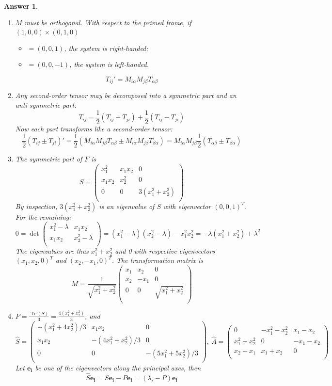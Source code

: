 \documentclass[a4paper]{article}
\DeclareMathOperator{\Tr}{Tr}
\newtheorem{ans}{Answer}[section]
\theoremstyle{new}
\begin{document}
\begin{ans}\leavevmode
\begin{enumerate}[label=(\alph*)]
\item $M$ must be orthogonal. With respect to the primed frame, if $(1,0,0)\times(0,1,0)$
\begin{itemize}
    \item $=(0,0,1)$, the system is right-handed;
    \item $=(0,0,-1)$, the system is left-handed.
\end{itemize}
$$T_{ij}'=M_{i\alpha}M_{j\beta}T_{\alpha\beta}$$
\item Any second-order tensor may be decomposed into a symmetric part and an anti-symmetric part:
$$T_{ij}=\frac{1}{2}(T_{ij}+T_{ji})+\frac{1}{2}(T_{ij}-T_{ji})$$
Now each part transforms like a second-order tensor:
$$\frac{1}{2}(T_{ij}\pm T_{ji})'=\frac{1}{2}(M_{i\alpha}M_{j\beta}T_{\alpha\beta}\pm M_{i\alpha}M_{j\beta}T_{\beta\alpha})=M_{i\alpha}M_{j\beta}\frac{1}{2}(T_{\alpha\beta}\pm T_{\beta\alpha})$$
\item The symmetric part of $F$ is 
$$S=\begin{pmatrix}x_1^2&x_1x_2&0\\x_1x_2&x_2^2&0\\0&0&3(x_1^2+x_2^2)\\\end{pmatrix}$$
By inspection, $3(x_1^2+x_2^2)$ is an eigenvalue of $S$ with eigenvector $(0,0,1)^T$. For the remaining:
$$0=\det\begin{pmatrix}x_1^2-\lambda&x_1x_2\\x_1x_2&x_2^2-\lambda\\\end{pmatrix}=(x_1^2-\lambda)(x_2^2-\lambda)-x_1^2x_2^2=-\lambda(x_1^2+x_2^2)+\lambda^2$$
The eigenvalues are thus $x_1^2+x_2^2$ and 0 with respective eigenvectors $(x_1,x_2,0)^T$ and $(x_2,-x_1,0)^T$. The transformation matrix is
$$M=\frac{1}{\sqrt{x_1^2+x_2^2}}\begin{pmatrix}x_1&x_2&0\\x_2&-x_1&0\\0&0&\sqrt{x_1^2+x_2^2}\\\end{pmatrix}$$
\item $P=\frac{\Tr(S)}{3}=\frac{4(x_1^2+x_2^2)}{3}$, and
$$\hat{S}=\begin{pmatrix}-(x_1^2+4x_2^2)/3&x_1x_2&0\\x_1x_2&-(4x_1^2+x_2^2)/3&0\\0&0&-(5x_1^2+5x_2^2)/3\\\end{pmatrix},~\hat{A}=\begin{pmatrix}0&-x_1^2-x_2^2&x_1-x_2\\x_1^2+x_2^2&0&-x_1-x_2\\x_2-x_1&x_1+x_2&0\\\end{pmatrix}$$
Let $\mathbf{e_i}$ be one of the eigenvectors along the principal axes, then
$$\hat{S}\mathbf{e_i}=S\mathbf{e_i}-P\mathbf{e_i}=(\lambda_i-P)\mathbf{e_i}$$
\end{enumerate}
\end{ans}
\end{document}
